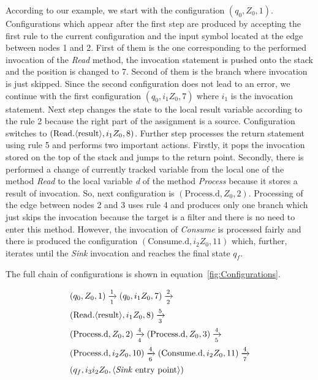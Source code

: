 According to our example, we start with the configuration $(q_0, Z_0, 1)$.
Configurations which appear after the first step are produced by accepting the first rule to the current configuration and the input symbol located at the edge between nodes 1 and 2.
First of them is the one corresponding to the performed invocation of the \textit{Read} method, the invocation statement is pushed onto the stack and the position is changed to 7. Second of them is the branch where invocation is just skipped.
Since the second configuration does not lead to an error, we continue with the first configuration $(q_0, i_1 Z_0, 7)$ where $i_1$ is the invocation statement.
Next step changes the state to the local \textlangle{}result\textrangle{} variable according to the rule 2 because the right part of the assignment is a source. Configuration switches to $(\text{Read.\textlangle{}result\textrangle{}}, i_1 Z_0, 8)$.
Further step processes the return statement using rule 5 and performs two important actions.
Firstly, it pops the invocation stored on the top of the stack and jumps to the return point.
Secondly, there is performed a change of currently tracked variable from the local one of the method \textit{Read} to the local variable \textit{d} of the method \textit{Process} because it stores a result of invocation.
So, next configuration is $(\text{Process.d}, Z_0, 2)$.
Processing of the edge between nodes 2 and 3 uses rule 4 and produces only one branch which just skips the invocation because the target is a filter and there is no need to enter this method.
However, the invocation of \textit{Consume} is processed fairly and there is produced the configuration $(\text{Consume.d}, i_2 Z_0, 11)$ which, further, iterates until the \textit{Sink} invocation and reaches the final state $q_f$.

The full chain of configurations is shown in equation~\ref{fig:Configurations}.

\begin{equation}
	\label{fig:Configurations}
	\begin{split}
		& (q_0, Z_0, 1) \xrightarrow[1]{1} (q_0, i_1 Z_0, 7) \xrightarrow[2]{2} \\
		& (\text{Read.\textlangle{}result\textrangle{}}, i_1 Z_0, 8) \xrightarrow[3]{5} \\
		& (\text{Process.d}, Z_0, 2) \xrightarrow[4]{4} (\text{Process.d}, Z_0, 3) \xrightarrow[5]{4} \\
		& (\text{Process.d}, i_2 Z_0, 10) \xrightarrow[6]{4} (\text{Consume.d}, i_2 Z_0, 11) \xrightarrow[7]{4} \\
		& (q_f, i_3 i_2 Z_0, \text{\textlangle{}\textit{Sink} entry point\textrangle{}})
	\end{split}
\end{equation}

